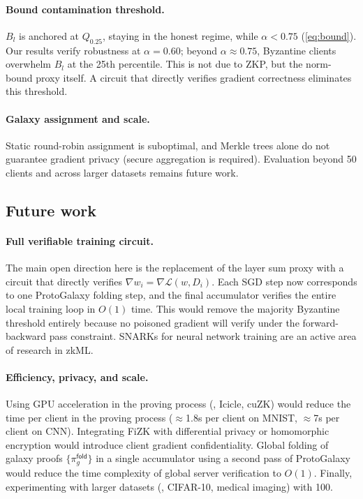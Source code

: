 \documentclass[10pt,twocolumn,letterpaper]{article}
\begin{document}
\paragraph{Bound contamination threshold.}
$B_l$ is anchored at $Q_{0.25}$, staying in the honest regime, while $\alpha < 0.75$ (\cref{eq:bound}). Our results verify robustness at $\alpha = 0.60$; beyond $\alpha \approx 0.75$, Byzantine clients overwhelm $B_l$ at the 25th percentile. This is not due to ZKP, but the norm-bound proxy itself. A circuit that directly verifies gradient correctness eliminates this threshold.

\paragraph{Galaxy assignment and scale.}
Static round-robin assignment is suboptimal, and Merkle trees alone do not guarantee gradient privacy (secure aggregation is required). Evaluation beyond 50 clients and across larger datasets remains future work.

\subsection{Future work}

\paragraph{Full verifiable training circuit.}
The main open direction here is the replacement of the layer sum proxy with a circuit that directly verifies $\nabla w_i = \nabla \mathcal{L}(w, D_i)$. Each SGD step now corresponds to one ProtoGalaxy folding step, and the final accumulator verifies the entire local training loop in $O(1)$ time. This would remove the majority Byzantine threshold entirely because no poisoned gradient will verify under the forward-backward pass constraint. SNARKs for neural network training are an active area of research in zkML.

\paragraph{Efficiency, privacy, and scale.}
Using GPU acceleration in the proving process (\eg, Icicle, cuZK) would reduce the time per client in the proving process ($\approx$1.8s per client on MNIST, $\approx$7s per client on CNN). Integrating FiZK with differential privacy or homomorphic encryption would introduce client gradient confidentiality. Global folding of galaxy proofs $\{\pi_g^{\mathsf{fold}}\}$ in a single accumulator using a second pass of ProtoGalaxy would reduce the time complexity of global server verification to $O(1)$. Finally, experimenting with larger datasets (\eg, CIFAR-10, medical imaging) with 100.
\end{document}
